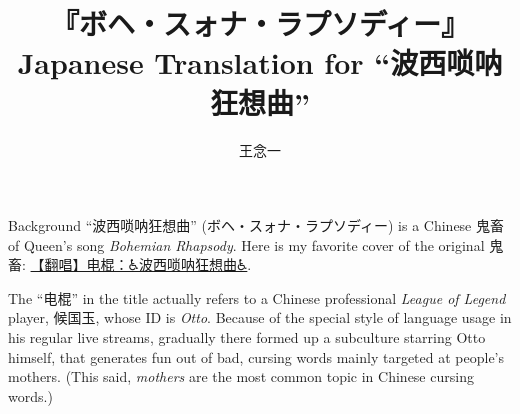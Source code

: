 \documentclass{ctexart}
\begin{document}
\setlength{\droptitle}{-.5in}
\setlength{\parindent}{0pt}
\setlength{\parskip}{4pt}

\title{
	『ボヘ・スォナ・ラプソディー』 \\
	{\large Japanese Translation for “波西唢呐狂想曲”}
}
\author{王念一}
\maketitle

\begin{section}{Background}
	“波西唢呐狂想曲” (ボヘ・スォナ・ラプソディー) is a Chinese 鬼畜 of Queen's song \emph{Bohemian Rhapsody}.
	Here is my favorite cover of the original 鬼畜: \href{https://www.bilibili.com/video/BV1Rv4y1B7Df}{【翻唱】电棍：♿波西唢呐狂想曲♿}.

	The “电棍” in the title actually refers to a Chinese professional \textit{League of Legend} player, 候国玉, whose ID is \textit{Otto}.
	Because of the special style of language usage in his regular live streams, gradually there formed up a subculture starring Otto himself, that generates fun out of bad, cursing words mainly targeted at people's mothers.
	(This said, \textit{mothers} are the most common topic in Chinese cursing words.)
\end{section}
\end{document}
